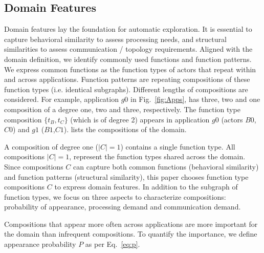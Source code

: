\subsection{Domain Features}
\label{sec:features}
Domain features lay the foundation for automatic exploration. It is essential to capture behavioral similarity to assess processing needs, and structural similarities to assess communication / topology requirements. Aligned with the domain definition, we identify commonly used functions and function patterns. We express common functions as the function types of actors that repeat within and across applications. Function patterns are repeating compositions of these function types (i.e. identical subgraphs). Different lengths of compositions are considered. For example, application $g0$ in Fig.~\ref{fig:Apps}, has three, two and one composition of a degree one, two and three, respectively. The function type composition $\{t_{B}, t_{C}\}$ (which is of degree 2) appears in application $g0$ (actors $B0$,$C0$) and $g1$ ($B1$,$C1$).  lists the compositions of the domain.

%

A composition of degree one ($\left\vert{C}\right\vert = 1$) contains a single function type. All compositions $\left\vert{C}\right\vert = 1$, represent the function types shared across the domain. Since compositions $C$ can capture both common functions (behavioral similarity) and function patterns (structural similarity), this paper chooses function type compositions $C$ to express domain features. In addition to the subgraph of function types, we focus on three aspects to characterize compositions: probability of appearance, processing demand and communication demand. 

Compositions that appear more often across applications are more important for the domain than infrequent compositions. To quantify the importance, we define appearance probability $P$ as per Eq.~\eqref{eq:p}. 

